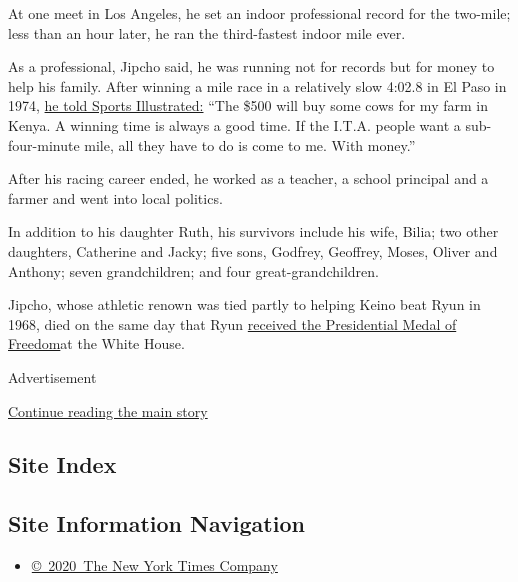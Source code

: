 At one meet in Los Angeles, he set an indoor professional record for the
two-mile; less than an hour later, he ran the third-fastest indoor mile
ever.

As a professional, Jipcho said, he was running not for records but for
money to help his family. After winning a mile race in a relatively slow
4:02.8 in El Paso in 1974,
\href{https://vault.si.com/vault/1974/05/06/the-pros-are-beginning-to-look-professional}{he
told Sports Illustrated:} ``The \$500 will buy some cows for my farm in
Kenya. A winning time is always a good time. If the I.T.A. people want a
sub-four-minute mile, all they have to do is come to me. With money.''

After his racing career ended, he worked as a teacher, a school
principal and a farmer and went into local politics.

In addition to his daughter Ruth, his survivors include his wife, Bilia;
two other daughters, Catherine and Jacky; five sons, Godfrey, Geoffrey,
Moses, Oliver and Anthony; seven grandchildren; and four
great-grandchildren.

Jipcho, whose athletic renown was tied partly to helping Keino beat Ryun
in 1968, died on the same day that Ryun
\href{https://kuathletics.com/jim-ryun-receives-presidential-medal-of-freedom/}{received
the Presidential Medal of Freedom}at the White House.

Advertisement

\protect\hyperlink{after-bottom}{Continue reading the main story}

\hypertarget{site-index}{%
\subsection{Site Index}\label{site-index}}

\hypertarget{site-information-navigation}{%
\subsection{Site Information
Navigation}\label{site-information-navigation}}

\begin{itemize}
\tightlist
\item
  \href{https://help.nytimes3xbfgragh.onion/hc/en-us/articles/115014792127-Copyright-notice}{©~2020~The
  New York Times Company}
\end{itemize}

